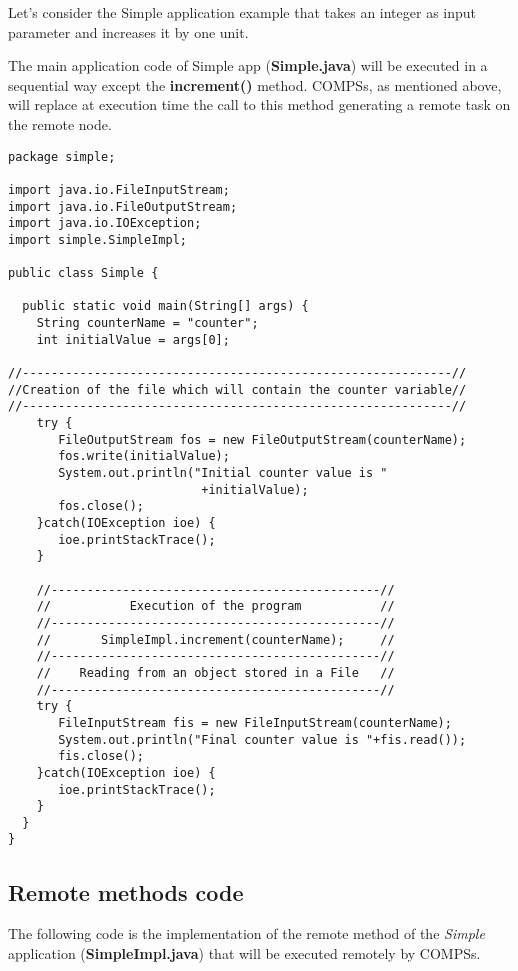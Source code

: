 Let’s consider the Simple application example that takes an integer as input parameter and increases it by one unit.

The main application code of Simple app ({\bf Simple.java}) will be executed in a sequential way except the
{\bf increment()} method. COMPSs, as mentioned above, will replace at execution time the call to this method
generating a remote task on the remote node.

\begin{lstlisting} 
package simple;

import java.io.FileInputStream;
import java.io.FileOutputStream;
import java.io.IOException;
import simple.SimpleImpl;

public class Simple {

  public static void main(String[] args) {
    String counterName = "counter";
    int initialValue = args[0];

//------------------------------------------------------------//
//Creation of the file which will contain the counter variable//
//------------------------------------------------------------//
    try {
       FileOutputStream fos = new FileOutputStream(counterName);
       fos.write(initialValue);
       System.out.println("Initial counter value is "
                           +initialValue);
       fos.close();
    }catch(IOException ioe) {
       ioe.printStackTrace();
    }
    
    //----------------------------------------------//
    //           Execution of the program           //
    //----------------------------------------------//
    //       SimpleImpl.increment(counterName);     //
    //----------------------------------------------//
    //    Reading from an object stored in a File   //
    //----------------------------------------------//
    try {
       FileInputStream fis = new FileInputStream(counterName);
       System.out.println("Final counter value is "+fis.read());
       fis.close();
    }catch(IOException ioe) {
       ioe.printStackTrace();
    }
  }
}
\end{lstlisting}


\subsection{Remote methods code}

The following code is the implementation of the remote method of the {\it Simple} application ({\bf SimpleImpl.java})
that will be executed remotely by COMPSs.


